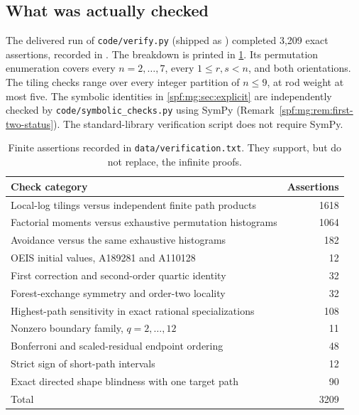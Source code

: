 \documentclass[11pt]{article}
\numberwithin{equation}{section}
\theoremstyle{definition}
\theoremstyle{remark}
\theoremstyle{definition}
\begin{document}
\subsection{What was actually checked}

The delivered run of \texttt{code/verify.py} (shipped as
) completed 3,209 exact
assertions, recorded in .
The breakdown is printed in \cref{spf:mg:tab:checks}. Its
permutation enumeration covers every $n=2,\ldots,7$, every
$1\le r,s<n$, and both orientations. The tiling checks range over every
integer partition of $n\le9$, at rod weight at most five. The symbolic
identities in \cref{spf:mg:sec:explicit} are independently checked by
\texttt{code/symbolic\_checks.py} using SymPy
(Remark~\ref{spf:mg:rem:first-two-status}). The standard-library
verification script does not require SymPy.

\begin{table}[htbp]
\centering\small
\renewcommand{\arraystretch}{1.08}
\begin{tabular}{@{}lr@{}}
\toprule
Check category & Assertions\\
\midrule
Local-log tilings versus independent finite path products & 1618\\
Factorial moments versus exhaustive permutation histograms & 1064\\
Avoidance versus the same exhaustive histograms & 182\\
OEIS initial values, A189281 and A110128 & 12\\
First correction and second-order quartic identity & 32\\
Forest-exchange symmetry and order-two locality & 32\\
Highest-path sensitivity in exact rational specializations & 108\\
Nonzero boundary family, $q=2,\ldots,12$ & 11\\
Bonferroni and scaled-residual endpoint ordering & 48\\
Strict sign of short-path intervals & 12\\
Exact directed shape blindness with one target path & 90\\
\midrule
Total & 3209\\
\bottomrule
\end{tabular}
\caption{Finite assertions recorded in \texttt{data/verification.txt}.
They support, but do not replace, the infinite proofs.}
\label{spf:mg:tab:checks}
\end{table}
\end{document}
